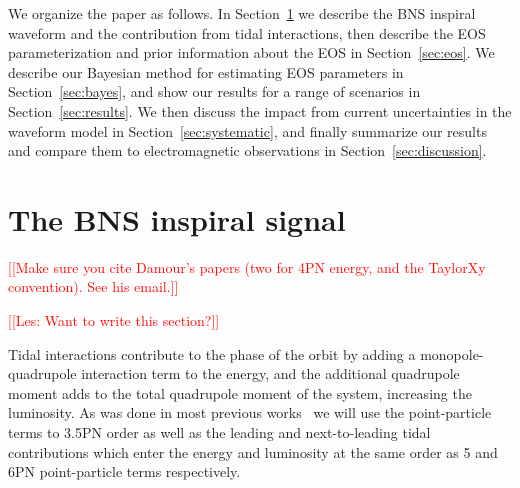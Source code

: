 \documentclass[twocolumn,prd,amssymb,aps,nofootinbib,showpacs,epsf]{revtex4}
\newcommand{\red}{\textcolor{red}}
\begin{document}
We organize the paper as follows. In Section~\ref{sec:waveform} we describe the BNS inspiral waveform and the contribution from tidal interactions, then describe the EOS parameterization and prior information about the EOS in Section~\ref{sec:eos}. We describe our Bayesian method for estimating EOS parameters in Section~\ref{sec:bayes}, and show our results for a range of scenarios in Section~\ref{sec:results}. We then discuss the impact from current uncertainties in the waveform model in Section~\ref{sec:systematic}, and finally summarize our results and compare them to electromagnetic observations in Section~\ref{sec:discussion}.


\section{The BNS inspiral signal}
\label{sec:waveform}

\red{[[Make sure you cite Damour's papers (two for 4PN energy, and the TaylorXy convention). See his email.]]}

\red{[[Les: Want to write this section?]]}


Tidal interactions contribute to the phase of the orbit by adding a monopole-quadrupole interaction term to the energy, and the additional quadrupole moment adds to the total quadrupole moment of the system, increasing the luminosity. As was done in most previous works~\cite{WadeCreightonOchsner2014, DelPozzoLiAgathos2013, Favata2014, YagiYunes2014} we will use the point-particle terms to 3.5PN order as well as the leading and next-to-leading tidal contributions which enter the energy and luminosity at the same order as 5 and 6PN point-particle terms respectively.
\end{document}
